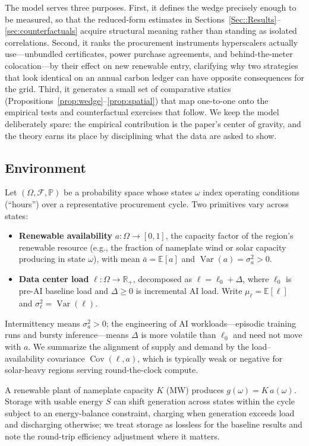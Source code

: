 \documentclass[a4paper,fleqn,longmktitle]{cas-sc}
\theoremstyle{plain}
\theoremstyle{definition}
\newcommand{\E}{\mathbb{E}}
\newcommand{\Var}{\operatorname{Var}}
\newcommand{\Cov}{\operatorname{Cov}}
\begin{document}
The model serves three purposes. First, it defines the wedge precisely enough to be measured, so that the reduced-form estimates in Sections~\ref{Sec::Results}--\ref{sec:counterfactuals} acquire structural meaning rather than standing as isolated correlations. Second, it ranks the procurement instruments hyperscalers actually use---unbundled certificates, power purchase agreements, and behind-the-meter colocation---by their effect on new renewable entry, clarifying why two strategies that look identical on an annual carbon ledger can have opposite consequences for the grid. Third, it generates a small set of comparative statics (Propositions~\ref{prop:wedge}--\ref{prop:spatial}) that map one-to-one onto the empirical tests and counterfactual exercises that follow. We keep the model deliberately spare: the empirical contribution is the paper's center of gravity, and the theory earns its place by disciplining what the data are asked to show.

\subsection{Environment}\label{subsec:model-environment}

Let $(\Omega,\mathcal{F},\mathbb{P})$ be a probability space whose states $\omega$ index operating conditions (``hours'') over a representative procurement cycle. Two primitives vary across states:
\begin{itemize}
    \item \textbf{Renewable availability} $a:\Omega\to[0,1]$, the capacity factor of the region's renewable resource (e.g., the fraction of nameplate wind or solar capacity producing in state $\omega$), with mean $\bar a=\E[a]$ and $\Var(a)=\sigma_a^2>0$.
    \item \textbf{Data center load} $\ell:\Omega\to\mathbb{R}_{+}$, decomposed as $\ell=\ell_0+\Delta$, where $\ell_0$ is pre-AI baseline load and $\Delta\ge 0$ is incremental AI load. Write $\mu_\ell=\E[\ell]$ and $\sigma_\ell^2=\Var(\ell)$.
\end{itemize}
Intermittency means $\sigma_a^2>0$; the engineering of AI workloads---episodic training runs and bursty inference---means $\Delta$ is more volatile than $\ell_0$ and need not move with $a$. We summarize the alignment of supply and demand by the load--availability covariance $\Cov(\ell,a)$, which is typically weak or negative for solar-heavy regions serving round-the-clock compute.

A renewable plant of nameplate capacity $K$ (MW) produces $g(\omega)=K\,a(\omega)$. Storage with usable energy $S$ can shift generation across states within the cycle subject to an energy-balance constraint, charging when generation exceeds load and discharging otherwise; we treat storage as lossless for the baseline results and note the round-trip efficiency adjustment where it matters.
\end{document}
